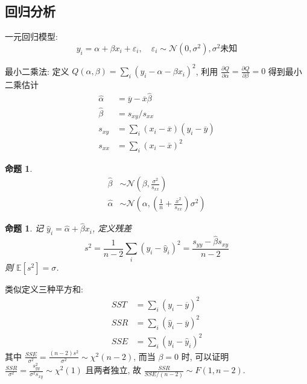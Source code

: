\documentclass[8pt]{article}
\theoremstyle{compact}
\newtheorem{proposition}[theorem]{命题}
\def\E#1{\mathbb{E}\left[{#1}\right]}
\begin{document}
\subsection{回归分析}
一元回归模型: $$y_i = \alpha + \beta x_i + \varepsilon_i, \quad \varepsilon_i \sim \mathcal N(0, \sigma^2), \sigma^2\mbox{未知}$$

最小二乘法: 定义 $Q(\alpha, \beta) = \sum_i (y_i - \alpha - \beta x_i)^2$, 利用 $\frac{\partial Q}{\partial \alpha} = \frac{\partial Q}{\partial \beta} = 0$ 得到最小二乘估计 \begin{align*}
	\hat\alpha &= \overline{y} - \overline{x}\hat\beta \\
	\hat\beta &= s_{xy} / s_{xx} \\
	s_{xy} &= \sum_i (x_i - \overline{x})(y_i - \overline{y}) \\
	s_{xx} &= \sum_i (x_i - \overline{x})^2
\end{align*}
\begin{proposition}
	\begin{align*}
		\hat\beta &\sim \mathcal N\left(\beta, \frac{\sigma^2}{s_{xx}}\right) \\
		\hat\alpha &\sim \mathcal N\left(\alpha, \left(\frac1n + \frac{\overline{x}^2}{s_{xx}}\right)\sigma^2\right)
	\end{align*}
\end{proposition}
\begin{proposition}
	记 $\hat{y}_i = \hat\alpha + \hat\beta x_i$, 定义残差 $$s^2 = \frac{1}{n-2}\sum_i(y_i - \hat y_i)^2 = \frac{s_{yy} - \hat\beta s_{xy}}{n-2}$$ 则 $\E{s^2} = \sigma$.
\end{proposition}
类似定义三种平方和: \begin{align*}
	SST &= \sum_i (y_i - \overline{y})^2 \\
	SSR &= \sum_i (\hat y_i - \overline{y})^2 \\
	SSE &= \sum_i (y_i - \hat y_i)^2
\end{align*}
其中 $\frac{SSE}{\sigma^2} = \frac{(n-2)s^2}{\sigma^2} \sim \chi^2(n - 2)$, 而当 $\beta = 0$ 时, 可以证明 $\frac{SSR}{\sigma^2} = \frac{s_{yy}^2}{\sigma^2s_{xy}} \sim \chi^2(1)$ 且两者独立, 故 $\frac{SSR}{SSE / (n - 2)} \sim F(1, n - 2)$.
\end{document}
